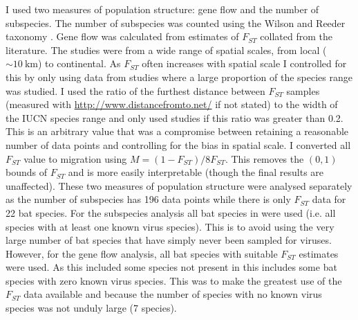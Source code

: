 I used two measures of population structure: gene flow and the number of subspecies.
The number of subspecies was counted using the Wilson and Reeder taxonomy \cite{wilson2005mammal}.
Gene flow was calculated from estimates of $F_{ST}$ collated from the literature.
The studies were from a wide range of spatial scales, from local ($\sim\SI{10}{\kilo\metre}$) to continental.
As $F_{ST}$ often increases with spatial scale \cite{burland1999population, hulva2010mechanisms, o2015genetic, vonhof2015range} I controlled for this by only using data from studies where a large proportion of the species range was studied.
I used the ratio of the furthest distance between $F_{ST}$ samples (measured with \url{http://www.distancefromto.net/} if not stated) to the width of the IUCN species range \cite{iucn} and only used studies if this ratio was greater than 0.2.
This is an arbitrary value that was a compromise between retaining a reasonable number of data points and controlling for the bias in spatial scale.
I converted all $F_{ST}$ value to migration using $M = (1-F_{ST})/8F_{ST}$.
This removes the $(0, 1)$ bounds of $F_{ST}$ and is more easily interpretable (though the final results are unaffected). 
These two measures of population structure were analysed separately as the number of subspecies has 196 data points while there is only $F_{ST}$ data for 22 bat species.
For the subspecies analysis all bat species in \textcite{luis2013comparison} were used (i.e. all species with at least one known virus species).
This is to avoid using the very large number of bat species that have simply never been sampled for viruses.
However, for the gene flow analysis, all bat species with suitable $F_{ST}$ estimates were used.
As this included some species not present in \textcite{luis2013comparison} this includes some bat species with zero known virus species. 
This was to make the greatest use of the $F_{ST}$ data available and because the number of species with no known virus species was not unduly large (7 species).



























